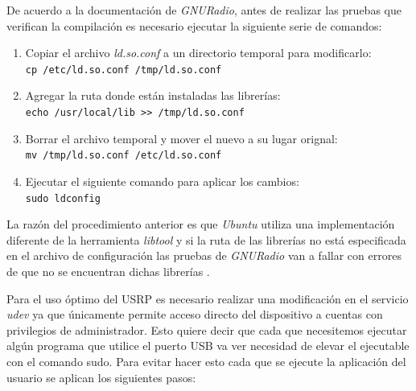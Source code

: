 De acuerdo a la documentaci\'on de \emph{GNURadio}, antes de realizar las
pruebas que verifican la compilaci\'on es necesario ejecutar la siguiente serie
de comandos:

\begin{enumerate}
  \item Copiar el archivo \emph{ld.so.conf} a un directorio temporal para
  modificarlo:\\
  \verb|cp /etc/ld.so.conf /tmp/ld.so.conf|
  \item Agregar la ruta donde est\'an instaladas las librer\'ias:\\
  \verb|echo /usr/local/lib >> /tmp/ld.so.conf|
  \item Borrar el archivo temporal y mover el nuevo a su lugar orignal:\\
  \verb|mv /tmp/ld.so.conf /etc/ld.so.conf|
  \item Ejecutar el siguiente comando para aplicar los cambios:\\
  \verb|sudo ldconfig|
\end{enumerate}

La raz\'on del procedimiento anterior es que \emph{Ubuntu} utiliza una
implementaci\'on diferente de la herramienta \emph{libtool} y si la ruta de las
librer\'ias no est\'a especificada en el archivo de configuraci\'on las pruebas
de \emph{GNURadio} van a fallar con errores de que no se encuentran dichas
librer\'ias \cite{radio}.


Para el uso \'optimo del USRP es necesario realizar una modificaci\'on en el
servicio \emph{udev} ya que \'unicamente permite acceso directo del dispositivo
a cuentas con privilegios de administrador. Esto quiere decir que cada que
necesitemos ejecutar alg\'un programa que utilice el puerto USB va ver necesidad
de elevar el ejecutable con el comando sudo. Para evitar hacer esto cada que se
ejecute la aplicaci\'on del usuario se aplican los siguientes pasos:

